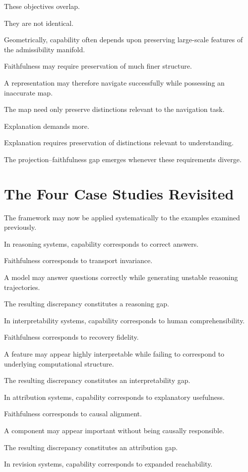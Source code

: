 \documentclass[11pt,oneside,openany]{book}
\begin{document}
These objectives overlap.

They are not identical.

Geometrically, capability often depends upon preserving large-scale features of the admissibility manifold.

Faithfulness may require preservation of much finer structure.

A representation may therefore navigate successfully while possessing an inaccurate map.

The map need only preserve distinctions relevant to the navigation task.

Explanation demands more.

Explanation requires preservation of distinctions relevant to understanding.

The projection--faithfulness gap emerges whenever these requirements diverge.

\section{The Four Case Studies Revisited}

The framework may now be applied systematically to the examples examined previously.

In reasoning systems, capability corresponds to correct answers.

Faithfulness corresponds to transport invariance.

A model may answer questions correctly while generating unstable reasoning trajectories.

The resulting discrepancy constitutes a reasoning gap.

In interpretability systems, capability corresponds to human comprehensibility.

Faithfulness corresponds to recovery fidelity.

A feature may appear highly interpretable while failing to correspond to underlying computational structure.

The resulting discrepancy constitutes an interpretability gap.

In attribution systems, capability corresponds to explanatory usefulness.

Faithfulness corresponds to causal alignment.

A component may appear important without being causally responsible.

The resulting discrepancy constitutes an attribution gap.

In revision systems, capability corresponds to expanded reachability.
\end{document}
